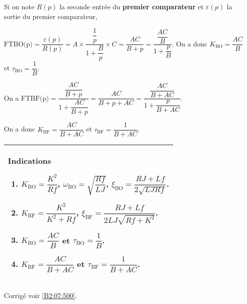 \ifprof
Si on note $R(p)$ la seconde entrée du \textbf{premier comparateur} et $\varepsilon(p)$ la sortie du premier comparateur,  

$\text{FTBO(p)}=\dfrac{\varepsilon(p)}{R(p)} = A \times \dfrac{\dfrac{1}{p}}{1+\dfrac{B}{p}}\times C = \dfrac{AC}{B+p} = \dfrac{\dfrac{AC}{B}}{1+\dfrac{p}{B}}$.
On a donc $K_{\text{BO}}=\dfrac{AC}{B}$ et $\tau_{\text{BO}}=\dfrac{1}{B}$.

\else 
\fi

 
\ifprof
On a
$\text{FTBF(p)} = \dfrac{\dfrac{AC}{B+p}}{1+\dfrac{AC}{B+p}}=\dfrac{AC}{B+p+AC}=\dfrac{\dfrac{AC}{B+AC}}{1+\dfrac{p}{B+AC}}$.

On a donc $K_{\text{BF}}=\dfrac{AC}{B+AC}$ et $\tau_{\text{BF}}=\dfrac{1}{B+AC}$.

\else 
\fi




 

\ifprof
\else
\footnotesize

\noindent
\begin{tabular}{|p{.9\linewidth}|}
\hline
Indications
\begin{enumerate}
\item $K_{\text{BO}}=\dfrac{K^2}{Rf}$, 
$\omega_{\text{BO}} = \sqrt{\dfrac{Rf}{LJ}}$,
$\xi_{\text{BO}} =\dfrac{RJ+Lf}{2\sqrt{LJRf}}$.
\item $K_{\text{BF}}=\dfrac{K^2}{K^2+Rf}$, 
$\xi_{\text{BF}}=\dfrac{RJ+Lf}{2LJ\sqrt{Rf+K^2}}$.
\item $K_{\text{BO}}=\dfrac{AC}{B}$ et $\tau_{\text{BO}}=\dfrac{1}{B}$.
\item $K_{\text{BF}}=\dfrac{AC}{B+AC}$ et $\tau_{\text{BF}}=\dfrac{1}{B+AC}$.
\end{enumerate} \\
\hline
\end{tabular}
\normalsize
\begin{flushright}
\footnotesize{Corrigé  voir \ref{B2:07:500}.}
\end{flushright}%
\fi